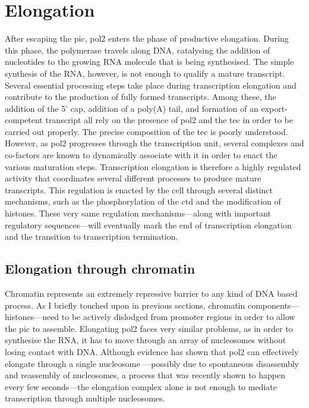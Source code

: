 \section{Elongation} %
After escaping the \gls{pic}, \gls{pol2} enters the phase of productive elongation.
During this phase, the polymerase travels along DNA, catalysing the addition of nucleotides to the growing RNA molecule that is being synthesised.
The simple synthesis of the RNA, however, is not enough to qualify a mature transcript.
Several essential processing steps take place during transcription elongation and contribute to the production of fully formed transcripts.
Among these, the addition of the 5' cap, addition of a poly(A) tail, and formation of an export-competent transcript all rely on the presence of \gls{pol2} and the \gls{tec} in order to be carried out properly.
The precise composition of the \gls{tec} is poorly understood. 
However, as \gls{pol2} progresses through the transcription unit, several complexes and co-factors are known to dynamically associate with it in order to enact the various maturation steps.  
Transcription elongation is therefore a highly regulated activity that coordinates several different processes to produce mature transcripts.
This regulation is enacted by the cell through several distinct mechanisms, such as the phosphorylation of the \gls{ctd} and the modification of histones.
These very same regulation mechanisms---along with important regulatory sequences---will eventually mark the end of transcription elongation and the transition to transcription termination.

\subsection{Elongation through chromatin}
Chromatin represents an extremely repressive barrier to any kind of DNA based process.
As I briefly touched upon in previous sections, chromatin components---histones---need to be actively dislodged from promoter regions in order to allow the \acrlong{pic} to assemble.
Elongating \gls{pol2} faces very similar problems, as in order to synthesise the RNA, it has to move through an array of nucleosomes without losing contact with DNA.
Although \invitro{} evidence has shown that \gls{pol2} can effectively elongate through a single nucleosome \citep{lorch:1987:nucleosomes}---possibly due to spontaneous disassembly and reassembly of nucleosomes, a process that was recently shown to happen every few seconds\citep{kim:2016:singlemolecule}---the elongation complex alone is not enough to mediate transcription through multiple nucleosomes.

